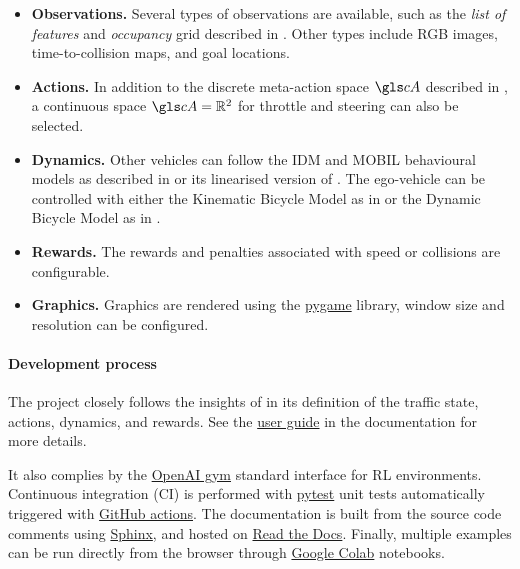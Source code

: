\begin{itemize}
	\item \textbf{Observations.} Several types of observations are available, such as the \emph{list of features} and \emph{occupancy} grid described in . Other types include RGB images, time-to-collision maps, and goal locations.
	\item \textbf{Actions.} In addition to the discrete meta-action space $\cA$ described in , a continuous space $\cA=\Real^2$ for throttle and steering can also be selected.
	\item \textbf{Dynamics.} Other vehicles can follow the \gls{IDM} and \gls{MOBIL} behavioural models as described in   or its linearised version of . The ego-vehicle can be controlled with either the Kinematic Bicycle Model as in  or the Dynamic Bicycle Model as in  .
	\item \textbf{Rewards.} The rewards and penalties associated with speed or collisions are configurable.
	\item \textbf{Graphics.} Graphics are rendered using the \href{https://www.pygame.org/news}{pygame} library, window size and resolution can be configured.
\end{itemize} 


\paragraph{Development process}

The project closely follows the insights of  in its definition of the traffic state, actions, dynamics, and rewards. See the \href{https://highway-env.readthedocs.io/en/latest/user\_guide.html}{user guide} in the documentation for more details.

It also complies by the \href{https://github.com/openai/gym}{OpenAI gym} standard interface for \gls{RL} environments. Continuous integration (CI) is performed with \href{https://docs.pytest.org/en/stable/}{pytest} unit tests automatically triggered with \href{https://github.com/features/actions}{GitHub actions}. The documentation is built from the source code comments using \href{https://www.sphinx-doc.org/en/master/}{Sphinx}, and hosted on \href{https://readthedocs.org/}{Read the Docs}. Finally, multiple examples can be run directly from the browser through \href{https://colab.research.google.com/}{Google Colab} notebooks.

